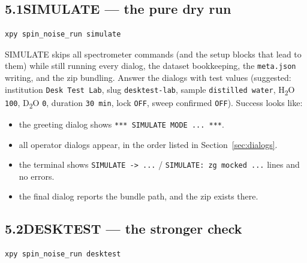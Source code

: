 \documentclass[11pt]{article}
\newcommand{\dtwo}{D\textsubscript{2}O}
\newcommand{\htwo}{H\textsubscript{2}O}
\newcommand{\file}[1]{\texttt{#1}}
\begin{document}
\subsection*{5.1\quad SIMULATE --- the pure dry run}

\begin{lstlisting}
xpy spin_noise_run simulate
\end{lstlisting}

SIMULATE skips all spectrometer commands (and the setup blocks that lead to
them) while still running every dialog, the dataset bookkeeping, the
\file{meta.json} writing, and the zip bundling. Answer the dialogs with test
values (suggested: institution \texttt{Desk Test Lab}, slug
\texttt{desktest-lab}, sample \texttt{distilled water}, \htwo{} \texttt{100},
\dtwo{} \texttt{0}, duration \texttt{30 min}, lock \texttt{OFF}, sweep
confirmed \texttt{OFF}). Success looks like:
\begin{itemize}
\item the greeting dialog shows \texttt{*** SIMULATE MODE ... ***}.
\item all operator dialogs appear, in the order listed in
      Section~\ref{sec:dialogs}.
\item the terminal shows \texttt{SIMULATE -> ...} / \texttt{SIMULATE: zg
      mocked ...} lines and no errors.
\item the final dialog reports the bundle path, and the zip exists there.
\end{itemize}

\subsection*{5.2\quad DESKTEST --- the stronger check}

\begin{lstlisting}
xpy spin_noise_run desktest
\end{lstlisting}
\end{document}
